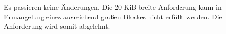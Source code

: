 
Es passieren keine \"{A}nderungen.
Die 20 KiB breite Anforderung kann in Ermangelung eines ausreichend gro\ss{}en Blockes nicht erf\"{u}llt werden.
Die Anforderung wird somit abgelehnt.
